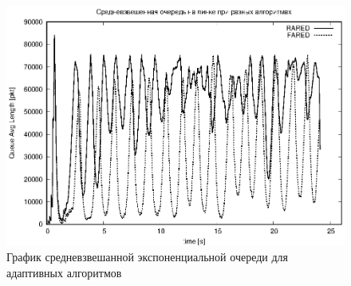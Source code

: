 \begin{figure}[!ht]
  \centering
  \includegraphics[width=0.7\linewidth]{image/av_queues_adaptive3.eps}
  \caption{График средневзвешанной экспоненциальной очереди для адаптивных алгоритмов}
  \label{fig:3.7}
\end{figure}











